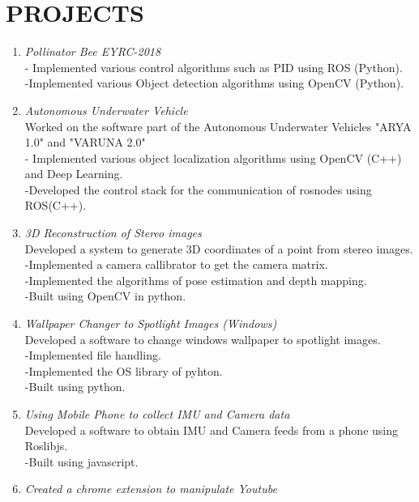 \documentclass[margin]{res}
\begin{document}
\section{PROJECTS } \begin{enumerate}
 \item  {\large{\sl Pollinator Bee EYRC-2018}}\\
        - Implemented various control algorithms such as PID using ROS (Python).\\
        -Implemented various Object detection algorithms using OpenCV (Python).\\

  \item  {\large{\sl Autonomous Underwater Vehicle}}\\
Worked on the software part of the Autonomous Underwater Vehicles "ARYA 1.0" and "VARUNA 2.0"\\
        - Implemented various object localization algorithms using OpenCV (C++) and Deep Learning.\\
        -Developed the control stack for the communication of rosnodes using ROS(C++).\\
\item {\large{\sl 3D Reconstruction of Stereo images}}\\
 Developed a system to generate 3D coordinates of a point from stereo images.\\
  	-Implemented a camera callibrator to get the camera matrix.\\
	-Implemented the algorithms of pose estimation and depth mapping.\\
	-Built using OpenCV in python.\\
\item {\large{\sl Wallpaper Changer to Spotlight Images (Windows)}}\\
 Developed a software to change windows wallpaper to spotlight images.\\
  	-Implemented file handling.\\
	-Implemented the OS library of pyhton.\\
	-Built using python.\\
\item {\large{\sl Using Mobile Phone to collect IMU and Camera data}}\\
 Developed a software to obtain IMU and Camera feeds from a phone using Roslibjs.\\
  	-Built using javascript.\\
\item {\large{\sl Created a chrome extension to manipulate Youtube}}\\

\end{enumerate}
\end{document}
